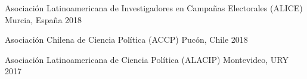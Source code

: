 \begin{cvhonors}
\cvconf
{Asociación Latinoamericana de Investigadores en Campañas Electorales (ALICE)} 
{Murcia, España}
{2018}
\end{cvhonors}

\begin{cvhonors}
\cvconf
{Asociación Chilena de Ciencia Política (ACCP)} 
{Pucón, Chile}
{2018}
\end{cvhonors}

\begin{cvhonors}
\cvconf
{Asociación Latinoamericana de Ciencia Política (ALACIP)} 
{Montevideo, URY}
{2017}
\end{cvhonors}









